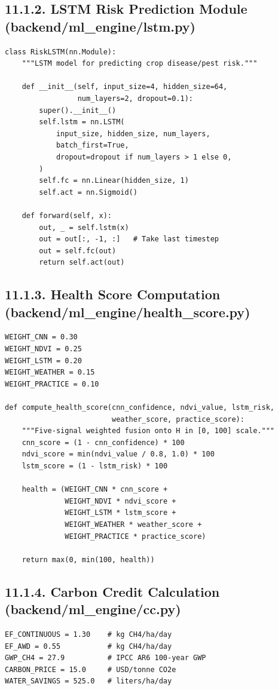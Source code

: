 \documentclass[12pt, a4paper]{report}
\begin{document}
\begin{enumerate}[leftmargin=*]
\begin{enumerate}[leftmargin=*]
\subsection{11.1.2. LSTM Risk Prediction Module (backend/ml_engine/lstm.py)}
\begin{Verbatim}[fontsize=\small]
class RiskLSTM(nn.Module):
    """LSTM model for predicting crop disease/pest risk."""

    def __init__(self, input_size=4, hidden_size=64,
                 num_layers=2, dropout=0.1):
        super().__init__()
        self.lstm = nn.LSTM(
            input_size, hidden_size, num_layers,
            batch_first=True,
            dropout=dropout if num_layers > 1 else 0,
        )
        self.fc = nn.Linear(hidden_size, 1)
        self.act = nn.Sigmoid()

    def forward(self, x):
        out, _ = self.lstm(x)
        out = out[:, -1, :]   # Take last timestep
        out = self.fc(out)
        return self.act(out)
\end{Verbatim}
\subsection{11.1.3. Health Score Computation (backend/ml_engine/health_score.py)}
\begin{Verbatim}[fontsize=\small]
WEIGHT_CNN = 0.30
WEIGHT_NDVI = 0.25
WEIGHT_LSTM = 0.20
WEIGHT_WEATHER = 0.15
WEIGHT_PRACTICE = 0.10

def compute_health_score(cnn_confidence, ndvi_value, lstm_risk,
                         weather_score, practice_score):
    """Five-signal weighted fusion onto H in [0, 100] scale."""
    cnn_score = (1 - cnn_confidence) * 100
    ndvi_score = min(ndvi_value / 0.8, 1.0) * 100
    lstm_score = (1 - lstm_risk) * 100

    health = (WEIGHT_CNN * cnn_score +
              WEIGHT_NDVI * ndvi_score +
              WEIGHT_LSTM * lstm_score +
              WEIGHT_WEATHER * weather_score +
              WEIGHT_PRACTICE * practice_score)

    return max(0, min(100, health))
\end{Verbatim}
\subsection{11.1.4. Carbon Credit Calculation (backend/ml_engine/cc.py)}
\begin{Verbatim}[fontsize=\small]
EF_CONTINUOUS = 1.30    # kg CH4/ha/day
EF_AWD = 0.55           # kg CH4/ha/day
GWP_CH4 = 27.9          # IPCC AR6 100-year GWP
CARBON_PRICE = 15.0     # USD/tonne CO2e
WATER_SAVINGS = 525.0   # liters/ha/day


\end{Verbatim}
\end{enumerate}
\end{enumerate}
\end{document}
